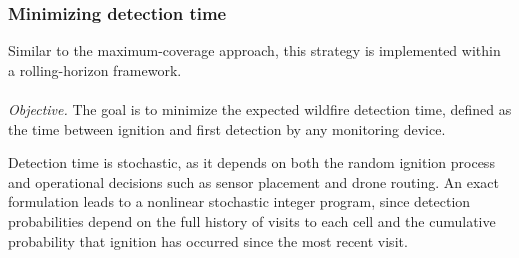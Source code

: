 \documentclass[pdflatex,sn-mathphys-num]{sn-jnl}%
\theoremstyle{thmstyleone}%
\theoremstyle{thmstyletwo}%
\theoremstyle{thmstylethree}%
\newcommand{\danique}[1]{\textcolor{magenta}{#1}}
\begin{document}

\subsubsection*{Minimizing detection time} 
Similar to the maximum-coverage approach, this strategy is implemented within a rolling-horizon framework.\\
\\
\noindent \textit{Objective.}
The goal is to minimize the expected wildfire detection time, defined as the time between ignition and first detection by any monitoring device.

Detection time is stochastic, as it depends on both the random ignition process and operational decisions such as sensor placement and drone routing. An exact formulation leads to a nonlinear stochastic integer program, since detection probabilities depend on the full history of visits to each cell and the cumulative probability that ignition has occurred since the most recent visit.
\end{document}
